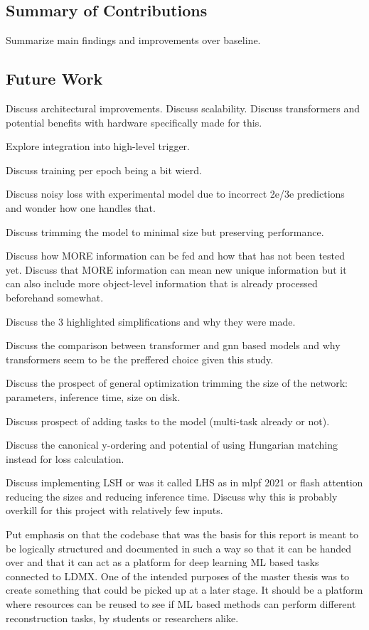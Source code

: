 
\subsection{Summary of Contributions}
Summarize main findings and improvements over baseline.

\subsection{Future Work}
Discuss architectural improvements. Discuss scalability.
Discuss transformers and potential benefits with hardware specifically made for this. 

Explore integration into high-level trigger.

Discuss training per epoch being a bit wierd.

Discuss noisy loss with experimental model due to incorrect 2e/3e predictions and wonder how one handles that. 

Discuss trimming the model to minimal size but preserving performance. 

Discuss how MORE information can be fed and how that has not been tested yet. Discuss that MORE information can mean new unique information but it can also include more object-level information that is already processed beforehand somewhat. 

Discuss the 3 highlighted simplifications and why they were made. 

Discuss the comparison between transformer and gnn based models and why transformers seem to be the preffered choice given this study. 

Discuss the prospect of general optimization trimming the size of the network: parameters, inference time, size on disk. 

Discuss prospect of adding tasks to the model (multi-task already or not). 

Discuss the canonical y-ordering and potential of using Hungarian matching instead for loss calculation. 

Discuss implementing LSH or was it called LHS as in mlpf 2021 or flash attention reducing the sizes and reducing inference time. Discuss why this is probably overkill for this project with relatively few inputs. 

Put emphasis on that the codebase that was the basis for this report is meant to be logically structured and documented in such a way so that it can be handed over and that it can act as a platform for deep learning ML based tasks connected to LDMX. One of the intended purposes of the master thesis was to create something that could be picked up at a later stage. It should be a platform where resources can be reused to see if ML based methods can perform  different reconstruction tasks, by students or researchers alike. 

